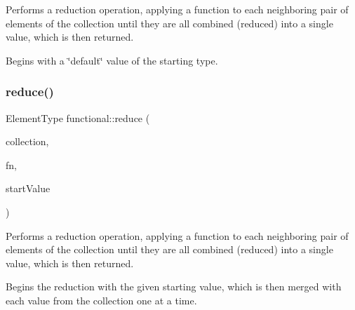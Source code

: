 Performs a reduction operation, applying a function to each neighboring pair of elements of the collection until they are all combined (reduced) into a single value, which is then returned. 

Begins with a \char`\"{}default\char`\"{} value of the starting type. \mbox{\label{namespacefunctional_a224d4a051c11150b90638e511dad2a6b}} 
\subsubsection{\texorpdfstring{reduce()}{reduce()}\hspace{0.1cm}{\footnotesize\ttfamily [2/2]}}
{\footnotesize\ttfamily Element\+Type functional\+::reduce (\begin{DoxyParamCaption}\item[{Collection\+Type}]{collection,  }\item[{std\+::function$<$ Element\+Type(const Element\+Type \&, const Element\+Type \&)$>$}]{fn,  }\item[{Element\+Type}]{start\+Value }\end{DoxyParamCaption})}



Performs a reduction operation, applying a function to each neighboring pair of elements of the collection until they are all combined (reduced) into a single value, which is then returned. 

Begins the reduction with the given starting value, which is then merged with each value from the collection one at a time. 